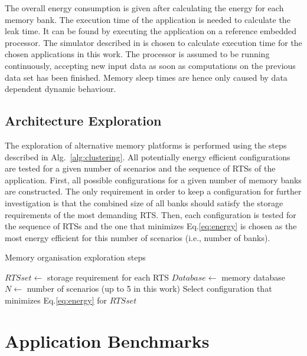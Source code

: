\documentclass[a4paper,conference]{IEEEtran}
\begin{document}
 The overall energy consumption is given after calculating the energy for each memory bank. The execution time of the application is needed to calculate the leak time. It can be found by executing the application on a reference embedded processor. The simulator described in \cite{Gem5} is chosen to calculate execution time for the chosen applications in this work. The processor is assumed to be running continuously, accepting new input data as soon as computations on the previous data set has been finished. Memory sleep times are hence only caused by data dependent dynamic behaviour.

\subsection{Architecture Exploration}

The exploration of alternative memory platforms is performed using the steps described in Alg.~\ref{alg:clustering}. All potentially energy efficient configurations are tested for a given number of scenarios and the sequence of RTSs of the application. First, all possible configurations for a given number of memory banks are constructed. The only requirement in order to keep a configuration for further investigation is that the combined size of all banks should satisfy the storage requirements of the most demanding RTS. Then, each configuration is tested for the sequence of RTSs and the one that minimizes Eq.\ref{eq:energy} is chosen as the most energy efficient for this number of scenarios (i.e., number of banks). 

\begin{algorithm}[!t]
\caption{Memory organisation exploration steps}
 \label{alg:clustering}
 \begin{algorithmic}[1]
		\STATE $RTSset \gets$ storage requirement for each RTS
		\STATE $Database \gets $ memory database
		\STATE $N \gets $ number of scenarios (up to 5 in this work)
				  \ENDIF
				\STATE Select configuration that minimizes Eq.\ref{eq:energy} for $RTSset$			
				\ENDFOR			
			\ENDFOR
 \end{algorithmic}
\end{algorithm}

 
\section{Application Benchmarks}
\label{sec:applications}
\end{document}
